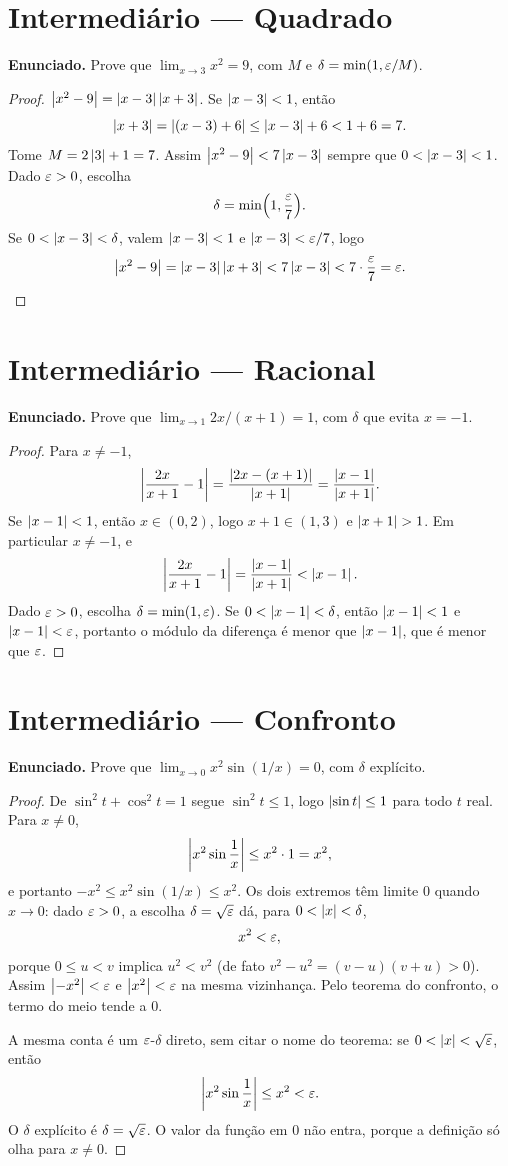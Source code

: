 \documentclass[11pt,a4paper]{article}
\begin{document}
\section{Intermedi\'ario --- Quadrado}

\textbf{Enunciado.} Prove que $\lim_{x\to 3}x^2=9$, com $M$ e $\delta=\min(1,\varepsilon/M)$.

\begin{proof}
$\left\lvert x^2-9 \right\rvert=\left\lvert x-3 \right\rvert\left\lvert x+3 \right\rvert$. Se $\left\lvert x-3 \right\rvert<1$, ent\~ao
\[
\left\lvert x+3 \right\rvert=\left\lvert (x-3)+6 \right\rvert\le \left\lvert x-3 \right\rvert+6<1+6=7.
\]
Tome $M=2\left\lvert 3 \right\rvert+1=7$. Assim $\left\lvert x^2-9 \right\rvert<7\left\lvert x-3 \right\rvert$ sempre que $0<\left\lvert x-3 \right\rvert<1$. Dado $\varepsilon>0$, escolha
\[
\delta=\min\Bigl(1,\frac{\varepsilon}{7}\Bigr).
\]
Se $0<\left\lvert x-3 \right\rvert<\delta$, valem $\left\lvert x-3 \right\rvert<1$ e $\left\lvert x-3 \right\rvert<\varepsilon/7$, logo
\[
\left\lvert x^2-9 \right\rvert=\left\lvert x-3 \right\rvert\left\lvert x+3 \right\rvert<7\left\lvert x-3 \right\rvert<7\cdot\frac{\varepsilon}{7}=\varepsilon.
\]
\end{proof}

\section{Intermedi\'ario --- Racional}

\textbf{Enunciado.} Prove que $\lim_{x\to 1}2x/(x+1)=1$, com $\delta$ que evita $x=-1$.

\begin{proof}
Para $x\neq -1$,
\[
\left\lvert \frac{2x}{x+1}-1 \right\rvert=\frac{\left\lvert 2x-(x+1) \right\rvert}{\left\lvert x+1 \right\rvert}=\frac{\left\lvert x-1 \right\rvert}{\left\lvert x+1 \right\rvert}.
\]
Se $\left\lvert x-1 \right\rvert<1$, ent\~ao $x\in(0,2)$, logo $x+1\in(1,3)$ e $\left\lvert x+1 \right\rvert>1$. Em particular $x\neq -1$, e
\[
\left\lvert \frac{2x}{x+1}-1 \right\rvert=\frac{\left\lvert x-1 \right\rvert}{\left\lvert x+1 \right\rvert}<\left\lvert x-1 \right\rvert.
\]
Dado $\varepsilon>0$, escolha $\delta=\min(1,\varepsilon)$. Se $0<\left\lvert x-1 \right\rvert<\delta$, ent\~ao $\left\lvert x-1 \right\rvert<1$ e $\left\lvert x-1 \right\rvert<\varepsilon$, portanto o m\'odulo da diferen\c{c}a \'e menor que $\left\lvert x-1 \right\rvert$, que \'e menor que $\varepsilon$.
\end{proof}

\section{Intermedi\'ario --- Confronto}

\textbf{Enunciado.} Prove que $\lim_{x\to 0}x^2\sin(1/x)=0$, com $\delta$ expl\'icito.

\begin{proof}
De $\sin^2 t+\cos^2 t=1$ segue $\sin^2 t\le 1$, logo $\left\lvert \sin t \right\rvert\le 1$ para todo $t$ real. Para $x\neq 0$,
\[
\left\lvert x^2\sin\frac{1}{x} \right\rvert\le x^2\cdot 1=x^2,
\]
e portanto $-x^2\le x^2\sin(1/x)\le x^2$. Os dois extremos t\^em limite $0$ quando $x\to 0$: dado $\varepsilon>0$, a escolha $\delta=\sqrt{\varepsilon}$ d\'a, para $0<\left\lvert x \right\rvert<\delta$,
\[
x^2<\varepsilon,
\]
porque $0\le u<v$ implica $u^2<v^2$ (de fato $v^2-u^2=(v-u)(v+u)>0$). Assim $\left\lvert -x^2 \right\rvert<\varepsilon$ e $\left\lvert x^2 \right\rvert<\varepsilon$ na mesma vizinhan\c{c}a. Pelo teorema do confronto, o termo do meio tende a $0$.

A mesma conta \'e um $\varepsilon$-$\delta$ direto, sem citar o nome do teorema: se $0<\left\lvert x \right\rvert<\sqrt{\varepsilon}$, ent\~ao
\[
\left\lvert x^2\sin\frac{1}{x} \right\rvert\le x^2<\varepsilon.
\]
O $\delta$ expl\'icito \'e $\delta=\sqrt{\varepsilon}$. O valor da fun\c{c}\~ao em $0$ n\~ao entra, porque a defini\c{c}\~ao s\'o olha para $x\neq 0$.
\end{proof}
\end{document}
